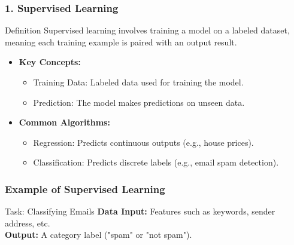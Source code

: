 \documentclass[aspectratio=169]{beamer}
\begin{document}
\begin{frame}[fragile]
    \frametitle{1. Supervised Learning}
    \begin{block}{Definition}
        Supervised learning involves training a model on a labeled dataset, meaning each training example is paired with an output result.
    \end{block}

    \begin{itemize}
        \item \textbf{Key Concepts:}
        \begin{itemize}
            \item Training Data: Labeled data used for training the model.
            \item Prediction: The model makes predictions on unseen data.
        \end{itemize}
        
        \item \textbf{Common Algorithms:}
        \begin{itemize}
            \item Regression: Predicts continuous outputs (e.g., house prices).
            \item Classification: Predicts discrete labels (e.g., email spam detection).
        \end{itemize}
    \end{itemize}
\end{frame}

\begin{frame}[fragile]
    \frametitle{Example of Supervised Learning}
    \begin{block}{Task: Classifying Emails}
        \textbf{Data Input:} Features such as keywords, sender address, etc.\\
        \textbf{Output:} A category label ("spam" or "not spam").
    \end{block}
\end{frame}
\end{document}
